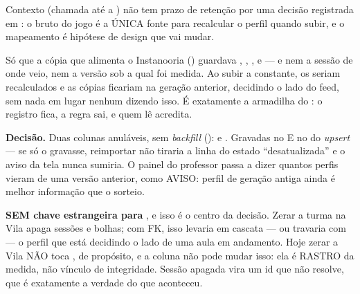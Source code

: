 \begin{especificacao}{Contexto}
 (chamada  até a ) não tem
prazo de retenção por uma decisão registrada em
: o bruto do jogo é a ÚNICA fonte para
recalcular o perfil quando  subir, e o mapeamento é
hipótese de design que vai mudar.

Só que a cópia que alimenta o Instanooria
() guardava ,
, ,  e  --- e nem a
sessão de onde veio, nem a versão sob a qual foi medida. Ao subir a constante,
os  seriam recalculados e as cópias ficariam na geração
anterior, decidindo o lado do feed, sem nada em lugar nenhum dizendo isso. É
exatamente a armadilha do : o registro fica, a regra sai, e quem
lê acredita.
\end{especificacao}

\textbf{Decisão.} Duas colunas anuláveis, sem \emph{backfill}
():
 e . Gravadas no  E no
 do \emph{upsert} --- se só o  gravasse, reimportar não
tiraria a linha do estado ``desatualizada'' e o aviso da tela nunca sumiria. O
painel do professor passa a dizer quantos perfis vieram de uma versão anterior,
como AVISO: perfil de geração antiga ainda é melhor informação que o sorteio.

\textbf{SEM chave estrangeira para }, e isso é o centro da
decisão. Zerar a turma na Vila apaga sessões e bolhas; com FK, isso levaria em
cascata --- ou travaria com  --- o perfil que está decidindo o lado
de uma aula em andamento. Hoje zerar a Vila NÃO toca , de
propósito, e a coluna não pode mudar isso: ela é RASTRO da medida, não vínculo
de integridade. Sessão apagada vira um id que não resolve, que é exatamente a
verdade do que aconteceu.

